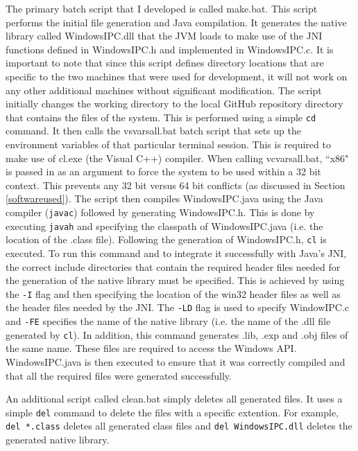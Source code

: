\documentclass[12pt] {newrucsthesis}    %
\def\code#1{\texttt{#1}}
\begin{document}
        The primary batch script that I developed is called make.bat. This script performs
        the initial file generation and Java compilation. It generates the native library called
        WindowsIPC.dll that the JVM loads to make use of the JNI functions defined in WindowsIPC.h
        and implemented in WindowsIPC.c. It is important to note that since this script defines directory locations
        that are specific to the two machines that were used for development, it will not work on any other
        additional machines without significant modification. The script initially changes the working directory
        to the local GitHub repository directory that contains the files of the system. This is performed using a simple
        \code{cd} command. It then calls the vsvarsall.bat batch script that sets up the environment variables
        of that particular terminal session. This is required to make use of cl.exe (the Visual C++) compiler.
        When calling vcvarsall.bat, ``x86" is passed in as an argument to force the system to be used within a
        32 bit context. This prevents any 32 bit versus 64 bit conflicts (as discussed in Section \ref{softwareused}).
        The script then compiles WindowsIPC.java using the Java compiler (\code{javac}) followed by generating
        WindowsIPC.h. This is done by executing \code{javah} and specifying the classpath of WindowsIPC.java
        (i.e. the location of the .class file). Following the generation of WindowsIPC.h, \code{cl} is
        executed. To run this command and to integrate it successfully with Java's JNI, the correct
        include directories that contain the required header files needed for
        the generation of the native library must be specified. This is achieved by using the \code{-I} flag
        and then specifying the location of the win32 header files as well as the header files needed by the JNI.
        The \code{-LD} flag is used to specify WindowIPC.c and \code{-FE} specifies the name of the native library (i.e.
        the name of the .dll file generated by \code{cl}).
        In addition, this command generates .lib, .exp and .obj files of the same name.
        These files are required to access the Windows API. %
        WindowsIPC.java is then executed to ensure that it was correctly
        compiled and that all the required files were generated successfully.

        An additional script called clean.bat simply deletes all generated files. It uses a simple \code{del}
        command to delete the files with a specific extention. For example, \code{del *.class}
        deletes all generated class files and \code{del WindowsIPC.dll} deletes the generated native library.
\end{document}
